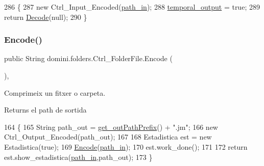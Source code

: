 \begin{DoxyCode}
286                                \{
287         \textcolor{keyword}{new} Ctrl\_Input\_Encoded(\hyperlink{classdomini_1_1folders_1_1Ctrl__FolderFile_a0d3946bb2832a1f34d0c2227df5c71c4}{path\_in});
288         \hyperlink{classdomini_1_1folders_1_1Ctrl__FolderFile_a0db81590abe27b21a9b8c37633c86fa6}{temporal\_output} = \textcolor{keyword}{true};
289         \textcolor{keywordflow}{return} \hyperlink{classdomini_1_1folders_1_1Ctrl__FolderFile_a5d28ac7f5223ecd40a242148e86447c1}{Decode}(null);
290     \}
\end{DoxyCode}
\mbox{\label{classdomini_1_1folders_1_1Ctrl__FolderFile_a7c47fd5127ae6f713a4fa7f75002a6f6}} 
\subsubsection{\texorpdfstring{Encode()}{Encode()}\hspace{0.1cm}{\footnotesize\ttfamily [1/2]}}
{\footnotesize\ttfamily public String domini.\+folders.\+Ctrl\+\_\+\+Folder\+File.\+Encode (\begin{DoxyParamCaption}{ }\end{DoxyParamCaption})\hspace{0.3cm}{\ttfamily [inline]}, {\ttfamily [private]}}



Comprimeix un fitxer o carpeta. 

\begin{DoxyReturn}{Returns}
el path de sortida 
\end{DoxyReturn}

\begin{DoxyCode}
164                             \{
165         String path\_out = \hyperlink{classdomini_1_1folders_1_1Ctrl__FolderFile_a11c6b1b4a25d12b8091c7c96b3da1ea7}{get\_outPathPrefix}() + \textcolor{stringliteral}{".jm"};
166         \textcolor{keyword}{new} Ctrl\_Output\_Encoded(path\_out);
167 
168         Estadistica est = \textcolor{keyword}{new} Estadistica(\textcolor{keyword}{true});
169         \hyperlink{classdomini_1_1folders_1_1Ctrl__FolderFile_a7c47fd5127ae6f713a4fa7f75002a6f6}{Encode}(\hyperlink{classdomini_1_1folders_1_1Ctrl__FolderFile_a0d3946bb2832a1f34d0c2227df5c71c4}{path\_in});
170         est.work\_done();
171 
172         \textcolor{keywordflow}{return} est.show\_estadistica(\hyperlink{classdomini_1_1folders_1_1Ctrl__FolderFile_a0d3946bb2832a1f34d0c2227df5c71c4}{path\_in},path\_out);
173     \}
\end{DoxyCode}
\mbox{\label{classdomini_1_1folders_1_1Ctrl__FolderFile_ac2cb74a86677ce947b403cc63b91e874}} 
